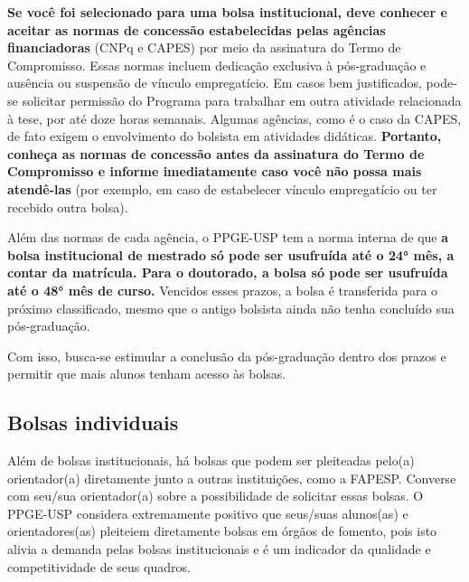 \documentclass[twoside a4paper 12pt]{report}
\begin{document}
\textbf{Se você foi selecionado para uma bolsa institucional, deve conhecer e aceitar as normas de concessão estabelecidas pelas agências financiadoras} (CNPq e CAPES) por meio da assinatura do Termo de Compromisso. Essas normas incluem dedicação exclusiva à pós-graduação e ausência ou suspensão de vínculo empregatício. Em casos bem justificados, pode-se solicitar permissão do Programa para trabalhar em outra atividade relacionada à tese, por até doze horas semanais. Algumas agências, como é o caso da CAPES, de fato exigem o envolvimento do bolsista em atividades didáticas. \textbf{Portanto, conheça as normas de concessão antes da assinatura do Termo de Compromisso e informe imediatamente caso você não possa mais atendê-las} (por exemplo, em caso de estabelecer vínculo empregatício ou ter recebido outra bolsa).

Além das normas de cada agência, o PPGE-USP tem a norma interna de que \textbf{a bolsa institucional de mestrado só pode ser usufruída até o 24° mês, a contar da matrícula. Para o doutorado, a bolsa só pode ser usufruída até o 48° mês de curso.} Vencidos esses prazos, a bolsa é transferida para o próximo classificado, mesmo que o antigo bolsista ainda não tenha concluído sua pós-graduação.

Com isso, busca-se estimular a conclusão da pós-graduação dentro dos prazos e permitir que mais alunos tenham acesso às bolsas.

\subsection{Bolsas individuais}

Além de bolsas institucionais, há bolsas que podem ser pleiteadas pelo(a) orientador(a) diretamente junto a outras instituições, como a FAPESP. Converse com seu/sua orientador(a) sobre a possibilidade de solicitar essas bolsas. O PPGE-USP considera extremamente positivo que seus/suas alunos(as) e orientadores(as) pleiteiem diretamente bolsas em órgãos de fomento, pois isto alivia a demanda pelas bolsas institucionais e é um indicador da qualidade e competitividade de seus quadros.


\end{document}
